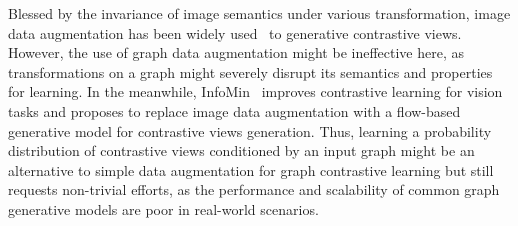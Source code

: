 Blessed by the invariance of image semantics under various transformation, image data augmentation has been widely used~\cite{cubuk2019autoaugment} to generative contrastive views. However, the use of graph data augmentation might be ineffective here, as transformations on a graph might severely disrupt its semantics and properties for learning. In the meanwhile, InfoMin~\cite{tian2020goodview} improves contrastive learning for vision tasks and proposes to replace image data augmentation with a flow-based generative model for contrastive views generation. Thus, learning a probability distribution of contrastive views conditioned by an input graph might be an alternative to simple data augmentation for graph contrastive learning but still requests non-trivial efforts, as the performance and scalability of common graph generative models are poor in real-world scenarios. 

\begin{table}[!tb]
    \caption{
    An overview of graph augmentation methods. The explanation of these properties can be found in Section \ref{sec-insight}.
    }
    \vspace{-0.3cm}
    \begin{minipage}{1\linewidth}
    \centering
    \end{minipage}
\label{tab-aug-compare}
\vspace{-0.6cm}
\end{table}

